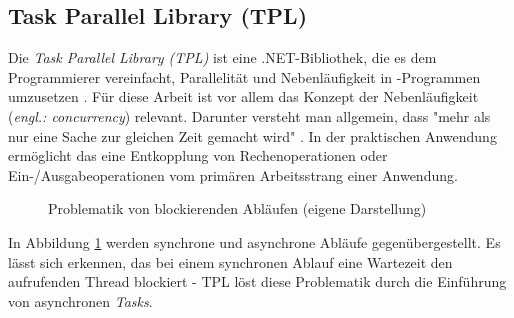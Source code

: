 \subsection{Task Parallel Library (TPL)}
\label{Task Parallel Library (TPL)}
Die \textit{Task Parallel Library (TPL)} ist eine .NET-Bibliothek, die es dem Programmierer vereinfacht, Parallelität und Nebenläufigkeit in \csharp-Programmen umzusetzen \cite{TPL}. Für diese Arbeit ist vor allem das Konzept der Nebenläufigkeit (\textit{engl.: concurrency}) relevant. Darunter versteht man allgemein, dass "mehr als nur eine Sache zur gleichen Zeit gemacht wird" \cite[Kapitel 1]{ConcurrencyinCSharp}. In der praktischen Anwendung ermöglicht das eine Entkopplung von Rechenoperationen oder Ein-/Ausgabeoperationen vom primären Arbeitsstrang einer Anwendung.
\begin{figure}[h!]
	\centering
	\caption{Problematik von blockierenden Abläufen (eigene Darstellung)}
	\label{Problematik von blockierenden Abläufen}
\end{figure}
In Abbildung \ref{Problematik von blockierenden Abläufen} werden synchrone und asynchrone Abläufe gegenübergestellt. Es lässt sich erkennen, das bei einem synchronen Ablauf eine Wartezeit den aufrufenden Thread blockiert - TPL löst diese Problematik durch die Einführung von asynchronen \textit{Tasks}.
